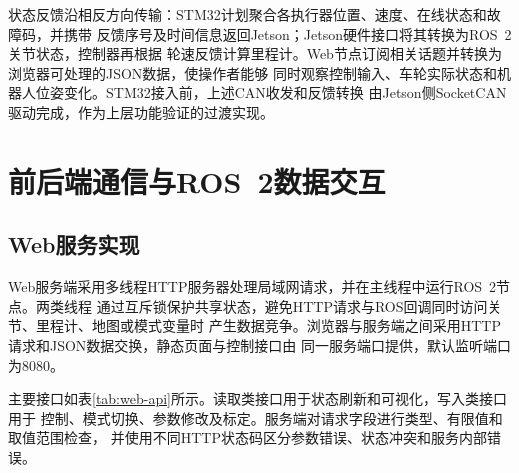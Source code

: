 \documentclass[UTF8,12pt,a4paper,openany]{ctexbook}
\begin{document}
状态反馈沿相反方向传输：STM32计划聚合各执行器位置、速度、在线状态和故障码，并携带
反馈序号及时间信息返回Jetson；Jetson硬件接口将其转换为ROS~2关节状态，控制器再根据
轮速反馈计算里程计。Web节点订阅相关话题并转换为浏览器可处理的JSON数据，使操作者能够
同时观察控制输入、车轮实际状态和机器人位姿变化。STM32接入前，上述CAN收发和反馈转换
由Jetson侧SocketCAN驱动完成，作为上层功能验证的过渡实现。

\section{前后端通信与ROS~2数据交互}

\subsection{Web服务实现}

Web服务端采用多线程HTTP服务器处理局域网请求，并在主线程中运行ROS~2节点。两类线程
通过互斥锁保护共享状态，避免HTTP请求与ROS回调同时访问关节、里程计、地图或模式变量时
产生数据竞争。浏览器与服务端之间采用HTTP请求和JSON数据交换，静态页面与控制接口由
同一服务端口提供，默认监听端口为8080。

主要接口如表\ref{tab:web-api}所示。读取类接口用于状态刷新和可视化，写入类接口用于
控制、模式切换、参数修改及标定。服务端对请求字段进行类型、有限值和取值范围检查，
并使用不同HTTP状态码区分参数错误、状态冲突和服务内部错误。
\end{document}
